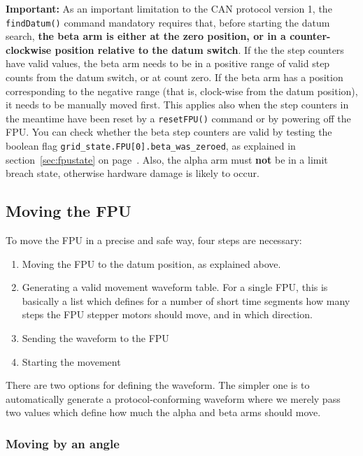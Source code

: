 \documentclass{scrartcl}[12pt,a4paper]
\begin{document}
\textbf{Important:} As an important limitation to the CAN protocol
version 1, the \texttt{findDatum()} command mandatory requires that,
before starting the datum search, \textbf{the beta arm is either at
  the zero position, or in a counter-clockwise position relative to
  the datum switch}. If the the step counters have valid values, the
beta arm needs to be in a positive range of valid step counts from the
datum switch, or at count zero. If the beta arm has a position
corresponding to the negative range (that is, clock-wise from the
datum position), it needs to be manually moved first.  This applies
also when the step counters in the meantime have been reset by a
\texttt{resetFPU()} command or by powering off the FPU. You can check
whether the beta step counters are valid by testing the boolean flag
\verb+grid_state.FPU[0].beta_was_zeroed+, as explained in
section~\ref{sec:fpustate} on page~\pageref{sec:fpustate}. Also, the
alpha arm must \textbf{not} be in a limit breach state, otherwise
hardware damage is likely to occur.


\subsection{Moving the FPU}

To move the FPU in a precise and safe way, four steps are necessary:

\begin{enumerate}
\item Moving the FPU to the datum position, as explained above.

\item Generating a valid movement waveform table. For a single FPU,
  this is basically a list which defines for a number of short time
  segments how many steps the FPU stepper motors should move, and in
  which direction.

\item Sending the waveform to the FPU
\item Starting the movement
  
\end{enumerate}

There are two options for defining the waveform. The simpler one is to
automatically generate a protocol-conforming waveform where we merely
pass two values which define how much the alpha and beta arms should
move.

\subsubsection{Moving by an angle}
\end{document}

